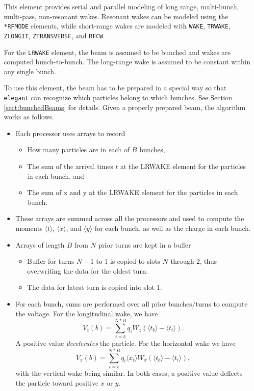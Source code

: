 This element provides serial and parallel modeling of long range, multi-bunch, multi-pass, non-resonant wakes.
Resonant wakes can be modeled using the \verb|*RFMODE| elements, while short-range wakes are modeled with
\verb|WAKE|, \verb|TRWAKE|, \verb|ZLONGIT|, \verb|ZTRANSVERSE|, and \verb|RFCW|.

For the \verb|LRWAKE| element, the beam is assumed to be bunched and wakes are computed bunch-to-bunch.
The long-range wake is assumed to be constant within any single bunch.

To use this element, the beam has to be prepared in a special way so that {\tt elegant} can recognize which
particles belong to which bunches.
See Section \ref{sect:bunchedBeams} for details.
Given a properly prepared beam, the algorithm works as follows.
\begin{itemize}
\item Each processor uses arrays to record
\begin{itemize}
  \item How many particles are in each of $B$ bunches,
  \item The sum of the arrival times $t$ at the LRWAKE element for the particles in each bunch, and
  \item The sum of x and y at the LRWAKE element for the particles in each bunch.
  \end{itemize}
\item These arrays are summed across all the processors and used to compute the moments
  $\langle t \rangle$, $\langle x \rangle$, and $\langle y \rangle$ for each bunch, as
  well as the charge in each bunch.
\item Arrays of length $B$ from $N$ prior turns are kept in a buffer
  \begin{itemize}
  \item Buffer for turns $N-1$ to $1$ is copied to slots $N$ through $2$, thus overwriting the data for
    the oldest turn.
  \item The data for latest turn is copied into slot 1.
  \end{itemize}
\item  For each bunch, sums are performed over all prior bunches/turns to compute the voltage. For the 
  longitudinal wake, we have
  \begin{equation}
    V_z(b) = \sum\limits_{i=b}^{N*B} q_i W_z(\langle t_b \rangle - \langle t_i \rangle).
  \end{equation}
A positive value {\em decelerates} the particle.
For the horizontal wake we have
  \begin{equation}
    V_x(b) = \sum\limits_{i=b}^{N*B} q_i \langle x_i \rangle W_x(\langle t_b \rangle - \langle t_i \rangle),
  \end{equation}
with the vertical wake being similar.
In both cases, a positive value deflects the particle toward positive $x$ or $y$.
\end{itemize}

